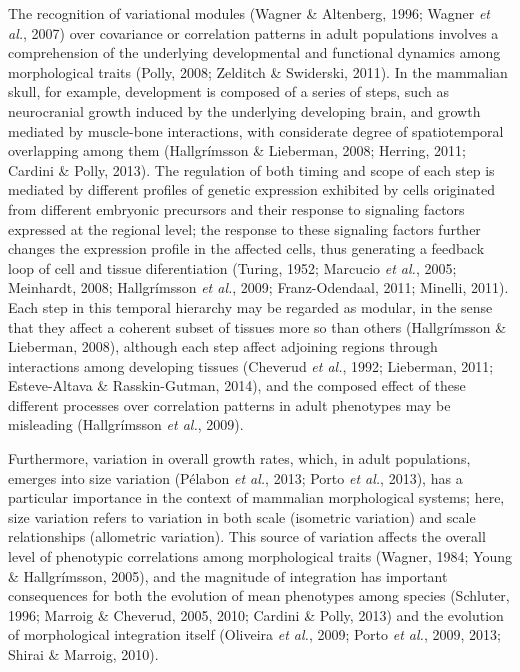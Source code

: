 \documentclass[12pt,]{article}
\begin{document}
The recognition of variational modules (Wagner \& Altenberg, 1996;
Wagner \emph{et al.}, 2007) over covariance or correlation patterns in
adult populations involves a comprehension of the underlying
developmental and functional dynamics among morphological traits (Polly,
2008; Zelditch \& Swiderski, 2011). In the mammalian skull, for example,
development is composed of a series of steps, such as neurocranial
growth induced by the underlying developing brain, and growth mediated
by muscle-bone interactions, with considerate degree of spatiotemporal
overlapping among them (Hallgrímsson \& Lieberman, 2008; Herring, 2011;
Cardini \& Polly, 2013). The regulation of both timing and scope of each
step is mediated by different profiles of genetic expression exhibited
by cells originated from different embryonic precursors and their
response to signaling factors expressed at the regional level; the
response to these signaling factors further changes the expression
profile in the affected cells, thus generating a feedback loop of cell
and tissue diferentiation (Turing, 1952; Marcucio \emph{et al.}, 2005;
Meinhardt, 2008; Hallgrímsson \emph{et al.}, 2009; Franz-Odendaal, 2011;
Minelli, 2011). Each step in this temporal hierarchy may be regarded as
modular, in the sense that they affect a coherent subset of tissues more
so than others (Hallgrímsson \& Lieberman, 2008), although each step
affect adjoining regions through interactions among developing tissues
(Cheverud \emph{et al.}, 1992; Lieberman, 2011; Esteve-Altava \&
Rasskin-Gutman, 2014), and the composed effect of these different
processes over correlation patterns in adult phenotypes may be
misleading (Hallgrímsson \emph{et al.}, 2009).

Furthermore, variation in overall growth rates, which, in adult
populations, emerges into size variation (Pélabon \emph{et al.}, 2013;
Porto \emph{et al.}, 2013), has a particular importance in the context
of mammalian morphological systems; here, size variation refers to
variation in both scale (isometric variation) and scale relationships
(allometric variation). This source of variation affects the overall
level of phenotypic correlations among morphological traits (Wagner,
1984; Young \& Hallgrímsson, 2005), and the magnitude of integration has
important consequences for both the evolution of mean phenotypes among
species (Schluter, 1996; Marroig \& Cheverud, 2005, 2010; Cardini \&
Polly, 2013) and the evolution of morphological integration itself
(Oliveira \emph{et al.}, 2009; Porto \emph{et al.}, 2009, 2013; Shirai
\& Marroig, 2010).
\end{document}
